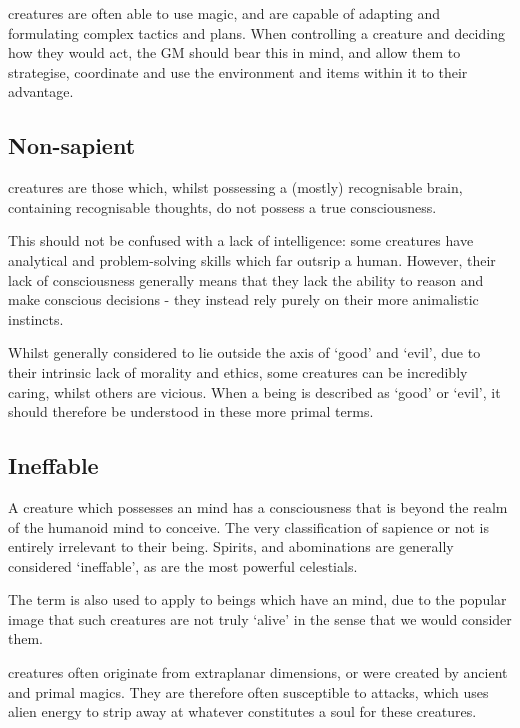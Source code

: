  creatures are often able to use magic, and are capable of adapting and formulating complex tactics and plans. When controlling a  creature and deciding how they would act, the GM should bear this in mind, and allow them to strategise, coordinate and use the environment and items within it to their advantage.

\subsection{Non-sapient}

 creatures are those which, whilst possessing a (mostly) recognisable brain, containing recognisable thoughts, do not possess a true consciousness. 

This should not be confused with a lack of intelligence: some  creatures have analytical and problem-solving skills which far outsrip a human. However, their lack of consciousness generally means that they lack the ability to reason and make conscious decisions - they instead rely purely on their more animalistic instincts. 

Whilst generally considered to lie outside the axis of `good' and `evil', due to their intrinsic lack of morality and ethics, some  creatures can be incredibly caring, whilst others are vicious. When a  being is described as `good' or `evil', it should therefore be understood in these more primal terms.  

\subsection{Ineffable}

A creature which possesses an  mind has a consciousness that is beyond the realm of the humanoid mind to conceive. The very classification of sapience or not is entirely irrelevant to their being. Spirits, and abominations are generally considered `ineffable', as are the most powerful celestials.  

The term  is also used to apply to beings which have an  mind, due to the popular image that such creatures are not truly `alive' in the sense that we would consider them. 

 creatures often originate from extraplanar dimensions, or were created by ancient and primal magics. They are therefore often susceptible to  attacks, which uses alien energy to strip away at whatever constitutes a soul for these creatures. 


